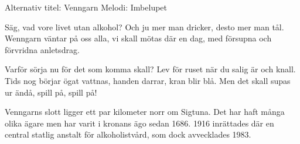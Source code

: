 \begin{song}

\begin{songmeta}
Alternativ titel: Venngarn
Melodi: Imbelupet
\end{songmeta}

\begin{songtext}
Säg, vad vore livet utan alkohol?
Och ju mer man dricker, desto mer man tål.
Wenngarn väntar på oss alla,
vi skall mötas där en dag,
med försupna och förvridna anletsdrag.

Varför sörja nu för det som komma skall?
Lev för ruset när du salig är och knall.
Tids nog börjar ögat vattnas,
handen darrar, kran blir blå.
Men det skall supas ur ändå, spill på, spill på!
\end{songtext}

\begin{songnotes}
Venngarns slott ligger ett par kilometer norr om Sigtuna. Det har haft många olika ägare men har varit i kronans ägo sedan 1686. 1916 inrättades där en central statlig anstalt för alkoholistvård, som dock avvecklades 1983.
\end{songnotes}

\end{song}

